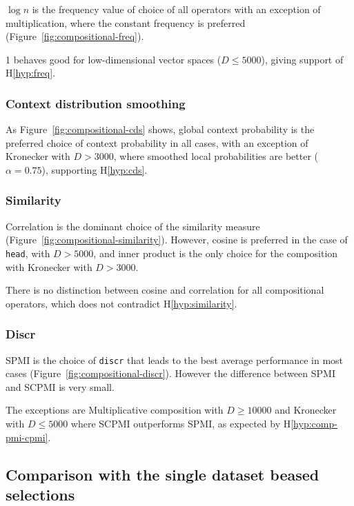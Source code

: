 $\log n$ is the frequency value of choice of all operators with an exception of multiplication, where the constant frequency is preferred (Figure~\ref{fig:compositional-freq}).

1 behaves good for low-dimensional vector spaces ($D \leq 5000$), giving support of H\ref{hyp:freq}.

\subsubsection{Context distribution smoothing}
\label{sec:cont-distr-smooth-compositional}



As Figure~\ref{fig:compositional-cds} shows, global context probability is the preferred choice of context probability in all cases, with an exception of Kronecker with $D > 3000$, where smoothed local probabilities are better ($\alpha = 0.75$), supporting H\ref{hyp:cds}.

\subsubsection{Similarity}
\label{sec:similarity-compositional}

Correlation is the dominant choice of the similarity measure (Figure~\ref{fig:compositional-similarity}). However, cosine is preferred in the case of \texttt{head}, with $D > 5000$, and inner product is the only choice for the composition with Kronecker with $D > 3000$.

There is no distinction between cosine and correlation for all compositional operators, which does not contradict H\ref{hyp:similarity}.

\subsubsection{Discr}
\label{sec:discr-compositional}



SPMI is the choice of \texttt{discr} that leads to the best average performance in most cases (Figure~\ref{fig:compositional-discr}). However the difference between SPMI and SCPMI is very small.

The exceptions are Multiplicative composition with $D \geq 10000$ and Kronecker with $D \leq 5000$ where SCPMI outperforms SPMI, as expected by H\ref{hyp:comp-pmi-cpmi}.

\subsection{Comparison with the single dataset beased selections}
\label{sec:comp-with-single-comp}


